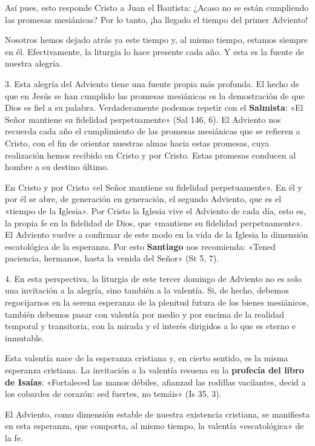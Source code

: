 \documentclass[]{article}
\begin{document}
Así pues, esto responde Cristo a Juan el Bautista: ¿Acaso no se están
cumpliendo las promesas mesiánicas? Por lo tanto, ¡ha llegado el tiempo
del primer Adviento!

Nosotros hemos dejado atrás ya este tiempo y, al mismo tiempo, estamos
siempre en él. Efectivamente, la liturgia lo hace presente cada año. Y
esta es la fuente de nuestra alegría.

3. Esta alegría del Adviento tiene una fuente propia más profunda. El
hecho de que en Jesús se han cumplido las promesas mesiánicas es la
demostración de que Dios es fiel a su palabra. Verdaderamente podemos
repetir con el \textbf{Salmista}: «El Señor mantiene su fidelidad
perpetuamente» (Sal 146, 6). El Adviento nos recuerda cada año el
cumplimiento de las promesas mesiánicas que se refieren a Cristo, con el
fin de orientar nuestras almas hacia estas promesas, cuya realización
hemos recibido en Cristo y por Cristo. Estas promesas conducen al hombre
a su destino último.

En Cristo y por Cristo «el Señor mantiene su fidelidad perpetuamente».
En él y por él se abre, de generación en generación, el segundo
Adviento, que es el «tiempo de la Iglesia». Por Cristo la Iglesia vive
el Adviento de cada día, esto es, la propia fe en la fidelidad de Dios,
que «mantiene su fidelidad perpetuamente». El Adviento vuelve a
confirmar de este modo en la vida de la Iglesia la dimensión
escatológica de la esperanza. Por esto \textbf{Santiago} nos recomienda:
«Tened paciencia, hermanos, hasta la venida del Señor» (St 5, 7).

4. En esta perspectiva, la liturgia de este tercer domingo de Adviento
no es solo una invitación a la alegría, sino también a la valentía. Si,
de hecho, debemos regocijarnos en la serena esperanza de la plenitud
futura de los bienes mesiánicos, también debemos pasar con valentía por
medio y por encima de la realidad temporal y transitoria, con la mirada
y el interés dirigidos a lo que es eterno e inmutable.

Esta valentía nace de la esperanza cristiana y, en cierto sentido, es la
misma esperanza cristiana. La invitación a la valentía resuena en la
\textbf{profecía del libro de Isaías}: «Fortaleced las manos débiles,
afianzad las rodillas vacilantes, decid a los cobardes de corazón: sed
fuertes, no temáis» (Is 35, 3).

El Adviento, como dimensión estable de nuestra existencia cristiana, se
manifiesta en esta esperanza, que comporta, al mismo tiempo, la valentía
«escatológica» de la fe.
\end{document}
